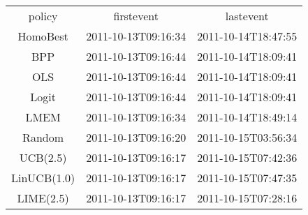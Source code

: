 \begin{tabular}{ccc}
policy & firstevent & lastevent\\
HomoBest & 2011-10-13T09:16:34 & 2011-10-14T18:47:55\\
BPP & 2011-10-13T09:16:44 & 2011-10-14T18:09:41\\
OLS & 2011-10-13T09:16:44 & 2011-10-14T18:09:41\\
Logit & 2011-10-13T09:16:44 & 2011-10-14T18:09:41\\
LMEM & 2011-10-13T09:16:34 & 2011-10-14T18:49:14\\
Random & 2011-10-13T09:16:20 & 2011-10-15T03:56:34\\
UCB(2.5) & 2011-10-13T09:16:17 & 2011-10-15T07:42:36\\
LinUCB(1.0) & 2011-10-13T09:16:17 & 2011-10-15T07:47:35\\
LIME(2.5) & 2011-10-13T09:16:17 & 2011-10-15T07:28:16\\
\end{tabular}
